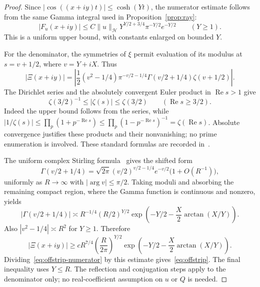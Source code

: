 \documentclass[11pt,a4paper]{article}
\numberwithin{equation}{section}
\theoremstyle{definition}
\theoremstyle{remark}
\newcommand{\Hh}{\mathcal H}
\newcommand{\norm}[1]{\lVert #1\rVert}
\begin{document}
\begin{proof}
Since $|\cos((x+iy)t)|\le\cosh(Yt)$, the numerator estimate follows from the same Gamma integral used in Proposition~\ref{prop:ray}:
\begin{equation}\label{eq:offstrip-numerator}
 |F_u(x+iy)|\le C\norm{u}_{\Hh}
 Y^{Y/2+3/4}\pi^{-Y/2}e^{-Y/2}\qquad(Y\ge1).
\end{equation}
This is a uniform upper bound, with constants enlarged on bounded $Y$.

For the denominator, the symmetries of $\xi$ permit evaluation of its modulus at $s=v+1/2$, where $v=Y+iX$. Thus
\[
 |\Xi(x+iy)|
 =\left|\frac12(v^2-1/4)\pi^{-v/2-1/4}
       \Gamma(v/2+1/4)\zeta(v+1/2)\right|.
\]
The Dirichlet series and the absolutely convergent Euler product in $\operatorname{Re}s>1$ give
\begin{equation}\label{eq:zeta-uniform}
 \zeta(3/2)^{-1}\le|\zeta(s)|\le\zeta(3/2)
 \qquad(\operatorname{Re}s\ge3/2).
\end{equation}
Indeed the upper bound follows from the series, while
$|1/\zeta(s)|\le\prod_p(1+p^{-\operatorname{Re}s})
 \le\prod_p(1-p^{-\operatorname{Re}s})^{-1}
 =\zeta(\operatorname{Re}s)$.
Absolute convergence justifies these products and their nonvanishing; no prime enumeration is involved. These standard formulas are recorded in~\cite[Eq.~25.2.11]{DLMFeuler}.

The uniform complex Stirling formula~\cite[\S5.11]{DLMFgamma} gives the shifted form
\[
 \Gamma(v/2+1/4)
 =\sqrt{2\pi}(v/2)^{v/2-1/4}e^{-v/2}
       \bigl(1+O(R^{-1})\bigr),
\]
uniformly as $R\to\infty$ with $|\arg v|\le\pi/2$. Taking moduli and absorbing the remaining compact region, where the Gamma function is continuous and nonzero, yields
\[
 |\Gamma(v/2+1/4)|\asymp
 R^{-1/4}(R/2)^{Y/2}
 \exp\left(-Y/2-\frac X2\arctan(X/Y)\right).
\]
Also $|v^2-1/4|\asymp R^2$ for $Y\ge1$. Therefore
\begin{equation}\label{eq:offstrip-denominator}
 |\Xi(x+iy)|\ge c R^{7/4}
 \left(\frac R{2\pi}\right)^{Y/2}
 \exp\left(-Y/2-\frac X2\arctan(X/Y)\right).
\end{equation}
Dividing~\eqref{eq:offstrip-numerator} by this estimate gives~\eqref{eq:offstrip}. The final inequality uses $Y\le R$. The reflection and conjugation steps apply to the denominator only; no real-coefficient assumption on $u$ or $Q$ is needed.
\end{proof}
\end{document}
